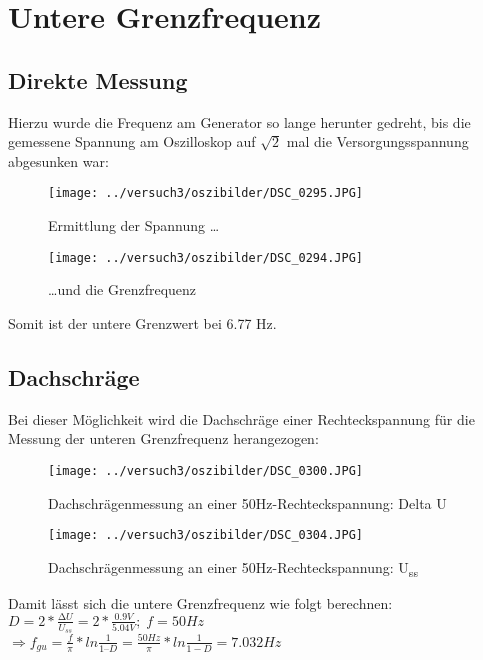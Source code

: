 \documentclass[]{beamer} %
\begin{document}
\section{Untere Grenzfrequenz}

\subsection{Direkte Messung}
\begin{frame}
Hierzu wurde die Frequenz am Generator so lange herunter gedreht, bis die gemessene Spannung am Oszilloskop auf $\sqrt{2}$ mal die Versorgungsspannung abgesunken war:
\begin{figure}[H]
		\texttt{[image: ../versuch3/oszibilder/DSC\_0295.JPG]}
		\caption{Ermittlung der Spannung \ldots}
\end{figure}
\end{frame}

\begin{frame}
\begin{figure}[H]
		\texttt{[image: ../versuch3/oszibilder/DSC\_0294.JPG]}
		\caption{\ldots und die Grenzfrequenz}
\end{figure}
Somit ist der untere Grenzwert bei 6.77 Hz.
\end{frame}




\subsection{Dachschräge}
\begin{frame}
	Bei dieser Möglichkeit wird die Dachschräge einer Rechteckspannung für die Messung der unteren Grenzfrequenz herangezogen:
	\begin{figure}[H]
		\centering
		\texttt{[image: ../versuch3/oszibilder/DSC\_0300.JPG]}
		\caption{Dachschrägenmessung an einer 50Hz-Rechteckspannung: Delta U}
	\end{figure}
\end{frame}
\begin{frame}
	\begin{figure}[H]
		\centering
		\texttt{[image: ../versuch3/oszibilder/DSC\_0304.JPG]}
		\caption{Dachschrägenmessung an einer 50Hz-Rechteckspannung: U\textsubscript{ss}}
	\end{figure}
\end{frame}
\begin{frame}
	Damit lässt sich die untere Grenzfrequenz wie folgt berechnen:\\
	$ D = 2 * \frac{∆U}{U_{ss}}=2*\frac{0.9V}{5.04V};\; f=50Hz $ \\
	$ \Rightarrow f_{gu}=\frac{f}{\pi} * ln \frac{1}{1 – D} = \frac{50Hz}{\pi}*ln\frac{1}{1-D} = 7.032 Hz $\\
\end{frame}
\end{document}
